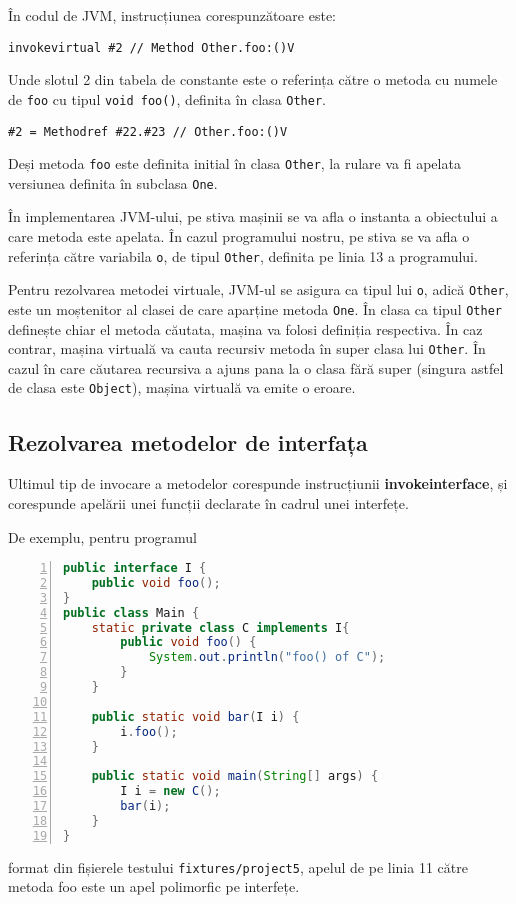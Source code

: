 În codul de JVM, instrucțiunea corespunzătoare este:

\texttt{invokevirtual \#2                  // Method Other.foo:()V}

Unde slotul 2 din tabela de constante este o referința către o metoda cu numele
de \texttt{foo} cu tipul \texttt{void foo()}, definita în clasa \texttt{Other}.

\texttt{\#2 = Methodref          \#22.\#23        // Other.foo:()V}

Deși metoda \texttt{foo} este definita initial în clasa \texttt{Other}, la
rulare va fi apelata versiunea definita în subclasa \texttt{One}.

În implementarea JVM-ului, pe stiva mașinii se va afla o instanta a obiectului
a care metoda este apelata. În cazul programului nostru, pe stiva se va afla o
referința către variabila \texttt{o}, de tipul \texttt{Other}, definita pe linia
13 a programului.

Pentru rezolvarea metodei virtuale, JVM-ul se asigura ca tipul lui \texttt{o},
adică \texttt{Other}, este un moștenitor al clasei de care aparține metoda
\texttt{One}. În clasa ca tipul \texttt{Other} definește chiar el metoda
căutata, mașina va folosi definiția respectiva.
În caz contrar, mașina virtuală va cauta recursiv metoda în super clasa lui
\texttt{Other}. În cazul în care căutarea recursiva a ajuns pana la o clasa fără
super (singura astfel de clasa este \texttt{Object}), mașina virtuală va emite o
eroare.

\subsection{Rezolvarea metodelor de interfața}

Ultimul tip de invocare a metodelor corespunde instrucțiunii
\textbf{invokeinterface}, și corespunde apelării unei funcții declarate în cadrul
unei interfețe.

De exemplu, pentru programul
\begin{lstlisting}[language=Java, numbers=left]
public interface I {
    public void foo();
}
public class Main {
    static private class C implements I{
        public void foo() {
            System.out.println("foo() of C");
        }
    }

    public static void bar(I i) {
        i.foo();
    }

    public static void main(String[] args) {
        I i = new C();
        bar(i);
    }
}
\end{lstlisting}
format din fișierele testului \texttt{fixtures/project5},
apelul de pe linia 11 către metoda foo este un apel polimorfic pe interfețe.

